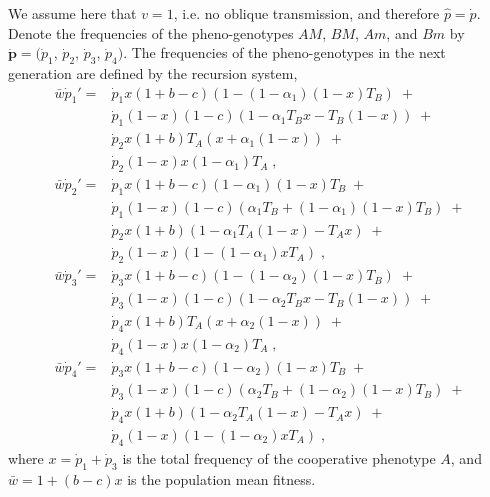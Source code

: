 \documentclass[12pt]{extarticle}
\let\vec\mathbf
\begin{document}
\begin{appendices}
We assume here that $v=1$, i.e. no oblique transmission, and therefore $\hat{p}=\dot{p}$.
Denote the frequencies of the pheno-genotypes $AM$, $BM$, $Am$, and $Bm$ by $\vec{\dot{p}}= (\dot{p}_1$, $\dot{p}_2$, $\dot{p}_3$, $\dot{p}_4)$. 
The frequencies of the pheno-genotypes in the next generation are defined by the recursion system, 
\begin{equation} \label{eq:next_gen_p_1}
  \begin{aligned}
  \bar{w}\dot{p}_1' = 
  & \dot{p}_1 x (1+b-c)(1 - (1-\alpha_1)(1-x)T_B) \;+ \\
  & \dot{p}_1(1-x)(1-c)(1-\alpha_1T_B x - T_B(1-x)) \;+ \\
  & \dot{p}_2 x (1+b)T_A(x + \alpha_1(1-x)) \;+ \\
  & \dot{p}_2(1-x)x(1-\alpha_1)T_A \;,
\\
  \bar{w}\dot{p}_2' = 
  & \dot{p}_1 x (1+b-c)(1-\alpha_1)(1-x)T_B \;+ \\
  & \dot{p}_1(1-x)(1-c)(\alpha_1 T_B + (1-\alpha_1)(1-x)T_B) \;+ \\
  & \dot{p}_2 x (1+b)(1-\alpha_1 T_A(1-x) - T_A x) \;+ \\
& \dot{p}_2(1-x)(1 - (1-\alpha_1) x T_A) \;, 
\\
  \bar{w}\dot{p}_3' =
  & \dot{p}_3 x (1+b-c)(1 - (1-\alpha_2)(1-x)T_B) \;+ \\
  & \dot{p}_3(1-x)(1-c)(1-\alpha_2 T_B x - T_B(1-x)) \;+ \\
  & \dot{p}_4 x (1+b)T_A(x + \alpha_2 (1-x)) \;+ \\
  & \dot{p}_4(1-x) x (1-\alpha_2)T_A \;, 
\\
  \bar{w}\dot{p}_4' =
  & \dot{p}_3 x (1+b-c)(1-\alpha_2)(1-x)T_B \;+ \\
  & \dot{p}_3(1-x)(1-c)(\alpha_2 T_B + (1-\alpha_2)(1-x)T_B) \;+ \\
  & \dot{p}_4 x (1+b)(1-\alpha_2T_A(1-x)-T_A x ) \;+ \\
  & \dot{p}_4(1-x)(1 - (1-\alpha_2) x T_A) \;,
  \end{aligned}
\end{equation}
where $x=\dot{p}_1+\dot{p}_3$ is the total frequency of the cooperative phenotype $A$, and $\bar{w} = 1 + (b-c) x$ is the population mean fitness.%


\end{appendices}
\end{document}
